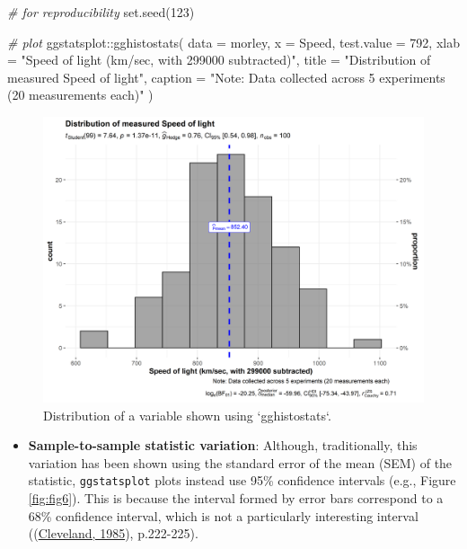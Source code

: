\documentclass[
]{article}
\newenvironment{Shaded}{\begin{snugshade}}{\end{snugshade}}
\newcommand{\AttributeTok}[1]{\textcolor[rgb]{0.77,0.63,0.00}{#1}}
\newcommand{\CommentTok}[1]{\textcolor[rgb]{0.56,0.35,0.01}{\textit{#1}}}
\newcommand{\DecValTok}[1]{\textcolor[rgb]{0.00,0.00,0.81}{#1}}
\newcommand{\FunctionTok}[1]{\textcolor[rgb]{0.00,0.00,0.00}{#1}}
\newcommand{\NormalTok}[1]{#1}
\newcommand{\SpecialCharTok}[1]{\textcolor[rgb]{0.00,0.00,0.00}{#1}}
\newcommand{\StringTok}[1]{\textcolor[rgb]{0.31,0.60,0.02}{#1}}
\providecommand{\tightlist}{%
  \setlength{\itemsep}{0pt}\setlength{\parskip}{0pt}}
\begin{document}
\begin{Shaded}
\begin{Highlighting}[]
\CommentTok{\# for reproducibility}
\FunctionTok{set.seed}\NormalTok{(}\DecValTok{123}\NormalTok{)}

\CommentTok{\# plot}
\NormalTok{ggstatsplot}\SpecialCharTok{::}\FunctionTok{gghistostats}\NormalTok{(}
  \AttributeTok{data =}\NormalTok{ morley,}
  \AttributeTok{x =}\NormalTok{ Speed,}
  \AttributeTok{test.value =} \DecValTok{792}\NormalTok{,}
  \AttributeTok{xlab =} \StringTok{"Speed of light (km/sec, with 299000 subtracted)"}\NormalTok{,}
  \AttributeTok{title =} \StringTok{"Distribution of measured Speed of light"}\NormalTok{,}
  \AttributeTok{caption =} \StringTok{"Note: Data collected across 5 experiments (20 measurements each)"}
\NormalTok{)}
\end{Highlighting}
\end{Shaded}

\begin{figure}[H]
\includegraphics[width=1\linewidth]{./figures/paper-fig5-1} \caption{Distribution of a variable shown using `gghistostats`.}\label{fig:fig5}
\end{figure}

\begin{itemize}
\tightlist
\item
  \textbf{Sample-to-sample statistic variation}: Although, traditionally, this
  variation has been shown using the standard error of the mean (SEM) of the
  statistic, \texttt{ggstatsplot} plots instead use 95\% confidence intervals (e.g.,
  Figure \ref{fig:fig6}). This is because the interval formed by error bars
  correspond to a 68\% confidence interval, which is not a particularly
  interesting interval ((\protect\hyperlink{ref-clevelandElementsGraphingData1985}{Cleveland, 1985}), p.222-225).
\end{itemize}
\end{document}
